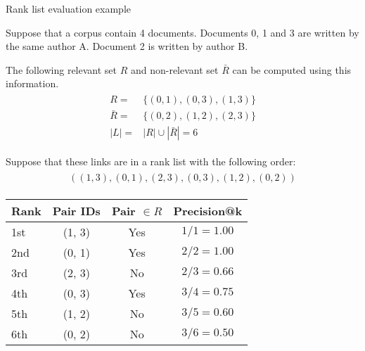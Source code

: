 \begin{example}[!t]
  \centering
  \caption{Rank list evaluation example}
  \label{ex:rank_list_eval}

  \begin{subexample}{\linewidth}

    Suppose that a corpus contain 4 documents.
    Documents 0, 1 and 3 are written by the same author A.
    Document 2 is written by author B.

    The following relevant set $R$ and non-relevant set $\bar{R}$ can be computed using this information.
    \begin{gather*}
      \begin{split}
              R =& \{(0, 1), (0, 3), (1, 3) \} \\
        \bar{R} =& \{(0, 2), (1, 2), (2, 3) \} \\
            |L| =& |R| \cup |\bar{R}| = 6
      \end{split}
    \end{gather*}

    Suppose that these links are in a rank list with the following order:
    \begin{gather*}
      \begin{split}
        ((1, 3), (0, 1), (2, 3), (0, 3), (1, 2), (0, 2))
      \end{split}
    \end{gather*}
  \end{subexample}

  \vspace{0.5cm}

  \begin{subexample}{\linewidth}
    \centering
    \begin{tabular}{l c c c}
      \toprule
      Rank  & Pair IDs & Pair $\in R$ & Precision@k\\
      \midrule
      1st   & (1, 3)   & Yes  & $1/1 = 1.00$ \\
      2nd   & (0, 1)   & Yes  & $2/2 = 1.00$ \\
      3rd   & (2, 3)   & No   & $2/3 = 0.66$ \\
      4th   & (0, 3)   & Yes  & $3/4 = 0.75$ \\
      5th   & (1, 2)   & No   & $3/5 = 0.60$ \\
      6th   & (0, 2)   & No   & $3/6 = 0.50$ \\
      \bottomrule
    \end{tabular}
  \end{subexample}


\end{example}

